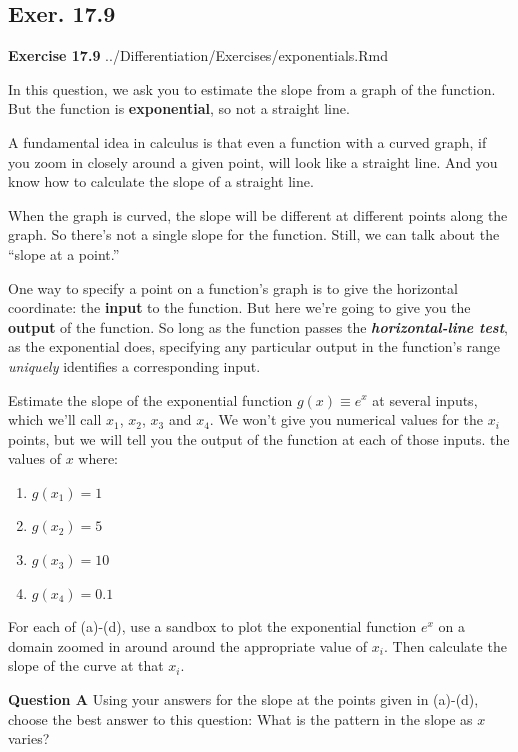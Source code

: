\documentclass[
  letterpaper,
  DIV=11,
  numbers=noendperiod,
  oneside]{article}
\providecommand{\tightlist}{%
  \setlength{\itemsep}{0pt}\setlength{\parskip}{0pt}}\usepackage{longtable,booktabs,array}
\begin{document}
\begin{multicols}{2}
\hypertarget{exer.-17.9}{%
\section*{Exer. 17.9}\label{exer.-17.9}}

\textbf{Exercise 17.9} ../Differentiation/Exercises/exponentials.Rmd

In this question, we ask you to estimate the slope from a graph of the
function. But the function is \textbf{exponential}, so not a straight
line.

A fundamental idea in calculus is that even a function with a curved
graph, if you zoom in closely around a given point, will look like a
straight line. And you know how to calculate the slope of a straight
line.

When the graph is curved, the slope will be different at different
points along the graph. So there's not a single slope for the function.
Still, we can talk about the ``slope at a point.''

One way to specify a point on a function's graph is to give the
horizontal coordinate: the \textbf{input} to the function. But here
we're going to give you the \textbf{output} of the function. So long as
the function passes the \textbf{\emph{horizontal-line test}}, as the
exponential does, specifying any particular output in the function's
range \emph{uniquely} identifies a corresponding input.

Estimate the slope of the exponential function \(g(x) \equiv e^x\) at
several inputs, which we'll call \(x_1\), \(x_2\), \(x_3\) and \(x_4\).
We won't give you numerical values for the \(x_i\) points, but we will
tell you the output of the function at each of those inputs. the values
of \(x\) where:

\begin{enumerate}
\def\labelenumi{\alph{enumi}.}
\tightlist
\item
  \(g(x_1) = 1\)
\item
  \(g(x_2) = 5\)
\item
  \(g(x_3) = 10\)
\item
  \(g(x_4) = 0.1\)
\end{enumerate}

For each of (a)-(d), use a sandbox to plot the exponential function
\(e^x\) on a domain zoomed in around around the appropriate value of
\(x_i\). Then calculate the slope of the curve at that \(x_i\).

\textbf{Question A} Using your answers for the slope at the points given
in (a)-(d), choose the best answer to this question: What is the pattern
in the slope as \(x\) varies?


\end{multicols}
\end{document}
